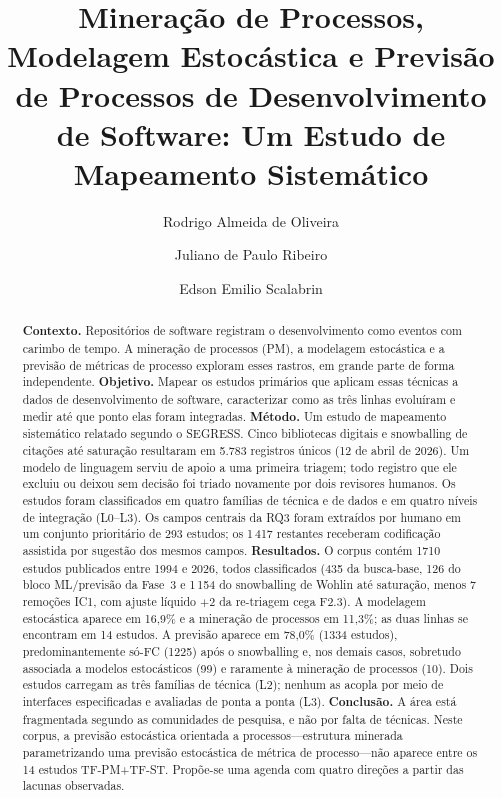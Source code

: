 \documentclass[preprint,12pt,authoryear=false]{elsarticle}
\newcommand{\PM}{TF-PM}
\newcommand{\ST}{TF-ST}
\begin{document}
\begin{frontmatter}

\title{Mineração de Processos, Modelagem Estocástica e Previsão de Processos de Desenvolvimento de Software: Um Estudo de Mapeamento Sistemático}

\author[pucpr]{Rodrigo Almeida de Oliveira}
\author[pucpr]{Juliano de Paulo Ribeiro}
\author[pucpr]{Edson Emilio Scalabrin}

\begin{abstract}\small
\textbf{Contexto.} Repositórios de software registram o desenvolvimento como eventos com carimbo de tempo. A mineração de processos (PM), a modelagem estocástica e a previsão de métricas de processo exploram esses rastros, em grande parte de forma independente.
\textbf{Objetivo.} Mapear os estudos primários que aplicam essas técnicas a dados de desenvolvimento de software, caracterizar como as três linhas evoluíram e medir até que ponto elas foram integradas.
\textbf{Método.} Um estudo de mapeamento sistemático relatado segundo o SEGRESS. Cinco bibliotecas digitais e snowballing de citações até saturação resultaram em 5.783 registros únicos (12 de abril de 2026). Um modelo de linguagem serviu de apoio a uma primeira triagem; todo registro que ele excluiu ou deixou sem decisão foi triado novamente por dois revisores humanos. Os estudos foram classificados em quatro famílias de técnica e de dados e em quatro níveis de integração (L0--L3). Os campos centrais da RQ3 foram extraídos por humano em um conjunto prioritário de 293 estudos; os 1\,417 restantes receberam codificação assistida por sugestão dos mesmos campos.
\textbf{Resultados.} O corpus contém 1710 estudos publicados entre 1994 e 2026, todos classificados (435 da busca-base, 126 do bloco ML/previsão da Fase~3 e 1\,154 do snowballing de Wohlin até saturação, menos 7 remoções IC1, com ajuste líquido $+2$ da re-triagem cega F2.3). A modelagem estocástica aparece em 16,9\% e a mineração de processos em 11,3\%; as duas linhas se encontram em 14 estudos. A previsão aparece em 78,0\% (1334 estudos), predominantemente só-FC (1225) após o snowballing e, nos demais casos, sobretudo associada a modelos estocásticos (99) e raramente à mineração de processos (10). Dois estudos carregam as três famílias de técnica (L2); nenhum as acopla por meio de interfaces especificadas e avaliadas de ponta a ponta (L3).
\textbf{Conclusão.} A área está fragmentada segundo as comunidades de pesquisa, e não por falta de técnicas. Neste corpus, a previsão estocástica orientada a processos---estrutura minerada parametrizando uma previsão estocástica de métrica de processo---não aparece entre os 14 estudos \PM{}+\ST{}. Propõe-se uma agenda com quatro direções a partir das lacunas observadas.
\end{abstract}


\end{frontmatter}
\end{document}
